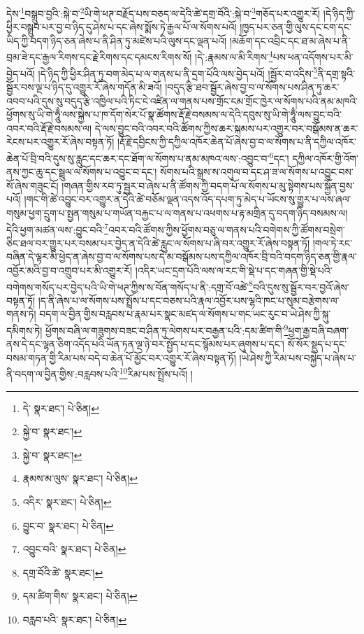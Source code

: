 དེས་\footnote{དེ་  སྣར་ཐང་།  པེ་ཅིན། }བསྒྲུབ་བྱའི་:སྐེ་བ་\footnote{སྐྱེ་བ་  སྣར་ཐང་། }ཡི་གེ་ཕཊ་བརྗོད་པས་བཅད་ལ་དེའི་ཚེ་དགྲ་བོའི་:སྐེ་བ་\footnote{སྐྱེ་བ་  སྣར་ཐང་། }གཅོད་པར་འགྱུར་རོ། །དེ་ཉིད་ཀྱི་ཕྱིར་བསྒྲུབ་པར་བྱ་བ་ཉིད་དུ་ཤེས་པ་དང་ཞེས་སྨོས་ཏེ་རྒྱལ་པོ་ལ་སོགས་པའོ། །ཁྱད་པར་ཅན་གྱི་ལུས་དང་ངག་དང་ཡིད་ཀྱི་བདག་ཉིད་ཅན་ཞེས་པ་ནི་ཤིན་ཏུ་མཛེས་པའི་ལུས་དང་ལྡན་པའོ། །མཆོག་དང་འབྲིང་དང་ཐ་མ་ཞེས་པ་ནི་བྲམ་ཟེ་དང་རྒྱལ་རིགས་དང་རྗེ་རིགས་དང་དམངས་རིགས་སོ། །དེ་:རྣམས་ལ་མི་རིགས་\footnote{རྣམས་མ་ལུས་  སྣར་ཐང་།  པེ་ཅིན། }པས་ཕན་འདོགས་པར་མི་བྱེད་པའོ། །དེ་ཉིད་ཀྱི་ཕྱིར་ཤིན་ཏུ་བག་མེད་པ་ལ་གནས་པ་ནི་དྲག་པོའི་ལས་བྱེད་པའོ། །སྦྱོར་བ་འདིས་\footnote{འདིར་  སྣར་ཐང་།  པེ་ཅིན། }ནི་དགྲ་སྟའི་སྦྱོར་བས་ལྔ་པ་ཉིད་དུ་འགྱུར་རོ་ཞེས་གདོན་མི་ཟའོ། །བདུད་རྩི་ཐབ་སྦྱོར་ཞེས་བྱ་བ་ལ་སོགས་པས་ཤིན་ཏུ་ཆར་འབབ་པའི་དུས་སུ་བདུད་རྩི་འཁྱིལ་པའི་ཏིང་ངེ་འཛིན་ལ་གནས་པས་གྲོང་ངམ་གྲོང་ཁྱེར་ལ་སོགས་པའི་ནམ་མཁའི་ཕྱོགས་སུ་ཡི་གེ་ཧཱུྃ་ལས་སྐྱེས་པ་ཁ་དོག་སེར་པོ་སྣ་ཚོགས་རྡོ་རྗེ་བསམས་ལ་དེའི་དབུས་སུ་ཡི་གེ་ཧཱུྃ་ལས་བྱུང་བའི་འབར་བའི་རྡོ་རྗེ་བསམས་ལ། དེ་ལས་བྱུང་བའི་འབར་བའི་ཚོགས་ཀྱིས་ཆར་སྐམས་པར་འགྱུར་བར་བསྒོམས་ན་ཆར་རེངས་པར་འགྱུར་རོ་ཞེས་བསྟན་ཏོ། །རྡོ་རྗེ་དབྱིངས་ཀྱི་དཀྱིལ་འཁོར་ཆེན་པོ་ཞེས་བྱ་བ་ལ་སོགས་པ་ནི་དཀྱིལ་འཁོར་ཆེན་པོ་བྲི་བའི་དུས་སུ་རླུང་དང་ཆར་དང་ཐོག་ལ་སོགས་པ་ནམ་མཁའ་ལས་:འབྱུང་བ་\footnote{བྱུང་བ་  སྣར་ཐང་།  པེ་ཅིན། }དང་། དཀྱིལ་འཁོར་གྱི་འོག་ནས་ཀྱང་ཆུ་དང་སྦྲུལ་ལ་སོགས་པ་འབྱུང་བ་དང་། སོགས་པའི་སྒྲས་ས་འགུལ་བ་དང་ཤ་ཟ་ལ་སོགས་པ་འབྱུང་བས་སོ་ཞེས་གཟུང་ངོ། །གཞན་གྱིས་རབ་ཏུ་སྦྱར་བ་ཞེས་པ་ནི་ཚོགས་ཀྱི་བདག་པོ་ལ་སོགས་པ་མུ་སྟེགས་པས་སྐྱོན་བྱས་པའོ། །གང་གི་ཚེ་འབྱུང་བར་འགྱུར་ན་དེའི་ཚེ་བཅོམ་ལྡན་འདས་འོད་དཔག་ཏུ་མེད་པ་ཡོངས་སུ་གྱུར་པ་ལས་ཞལ་གསུམ་ཕྱག་དྲུག་པ་སྤྱན་གསུམ་པ་གཡོན་བརྐྱང་པ་ལ་གནས་པ་འཕགས་པ་རྟ་མགྲིན་དུ་བདག་ཉིད་བསམས་ལ། དེའི་ཕྱག་མཚན་ལས་:བྱུང་བའི་\footnote{འབྱུང་བའི་  སྣར་ཐང་།  པེ་ཅིན། }འབར་བའི་ཚོགས་ཀྱིས་ཕྱོགས་བཅུ་ལ་གནས་པའི་བགེགས་ཀྱི་ཚོགས་བསྲེག་ཅིང་ཐལ་བར་གྱུར་པར་བསམ་པར་བྱེད་ན་དེའི་ཚེ་རླུང་ལ་སོགས་པ་ཞི་བར་འགྱུར་རོ་ཞེས་བསྟན་ཏོ། །གལ་ཏེ་རང་བཞིན་དེ་ལྟར་མི་ཕྱེད་ན་ཞེས་བྱ་བ་ལ་སོགས་པས་དེ་མ་བསྒོམས་པས་དཀྱིལ་འཁོར་བྲི་བའི་བདག་ཉིད་ཅན་གྱི་རྣལ་འབྱོར་མའི་བྱ་བ་འགྲུབ་པར་མི་འགྱུར་རོ། །འདིར་ཡང་དྲག་པོའི་ལས་ལ་རང་གི་སྡེ་པ་དང་གཞན་གྱི་སྡེ་པའི་བགེགས་གསོད་པར་བྱེད་པའི་ཡི་གེ་ཕཊ་ཀྱིས་ས་བོན་གསོད་པ་ནི་:དགྲ་བོ་འཚེ་\footnote{དགྲ་བོའི་ཚེ་  སྣར་ཐང་། }བའི་དུས་སུ་སྦྱོར་བར་བྱའོ་ཞེས་བསྟན་ཏོ། །ད་ནི་ཞེས་པ་ལ་སོགས་པས་སྤྲོས་པ་དང་བཅས་པའི་རྣལ་འབྱོར་པས་ལྷའི་ཁང་པ་སུམ་བརྩེགས་ལ་གནས་ཏེ། བདག་ལ་བྱིན་གྱིས་བརླབས་པ་རྣམ་པར་སྣང་མཛད་ལ་སོགས་པ་གང་ཡང་རུང་བ་ཡེ་ཤེས་ཀྱི་སྐུ་དམིགས་ཏེ། ཕྱོགས་བཞི་ལ་གཟུགས་བཟང་བ་ཤིན་ཏུ་ལེགས་པར་བརྒྱན་པའི་:དམ་ཚིག་གི་\footnote{དམ་ཚིག་གིས་  སྣར་ཐང་།  པེ་ཅིན། }ཕྱག་རྒྱ་བཞི་བཞག་ནས་དེ་དང་ལྷན་ཅིག་འདོད་པའི་ཡོན་ཏན་ལྔ་ཉེ་བར་སྤྱོད་པ་དང་སྙོམས་པར་ཞུགས་པ་དང་། སོ་སོར་སྡུད་པ་དང་བསམ་གཏན་གྱི་རིམ་པས་བདེ་བ་ཆེན་པོ་མྱོང་བར་འགྱུར་རོ་ཞེས་བསྟན་ཏོ། །ཡེ་ཤེས་ཀྱི་རིམ་པས་བསྐྱེད་པ་ཞེས་པ་ནི་བདག་ལ་བྱིན་གྱིས་:བརླབས་པའི་\footnote{བརླབ་པའི་  སྣར་ཐང་།  པེ་ཅིན། }རིམ་པས་སྤྲོས་པའོ། །

